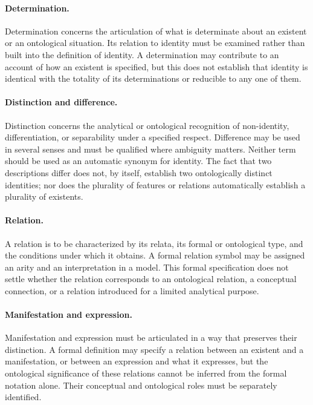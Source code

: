 \paragraph{Determination.}

Determination concerns the articulation of what is determinate
about an existent or an ontological situation. Its relation to
identity must be examined rather than built into the definition of
identity. A determination may contribute to an account of how an
existent is specified, but this does not establish that identity
is identical with the totality of its determinations or reducible
to any one of them.

\paragraph{Distinction and difference.}

Distinction concerns the analytical or ontological recognition of
non-identity, differentiation, or separability under a specified
respect. Difference may be used in several senses and must be
qualified where ambiguity matters. Neither term should be used as
an automatic synonym for identity. The fact that two descriptions
differ does not, by itself, establish two ontologically distinct
identities; nor does the plurality of features or relations
automatically establish a plurality of existents.

\paragraph{Relation.}

A relation is to be characterized by its relata, its formal or
ontological type, and the conditions under which it obtains. A
formal relation symbol may be assigned an arity and an interpretation
in a model. This formal specification does not settle whether the
relation corresponds to an ontological relation, a conceptual
connection, or a relation introduced for a limited analytical
purpose.

\paragraph{Manifestation and expression.}

Manifestation and expression must be articulated in a way that
preserves their distinction. A formal definition may specify a
relation between an existent and a manifestation, or between an
expression and what it expresses, but the ontological significance
of these relations cannot be inferred from the formal notation
alone. Their conceptual and ontological roles must be separately
identified.

